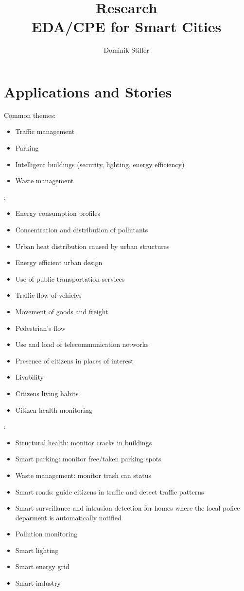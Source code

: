 \documentclass[]{scrartcl}
\title{Research \\ EDA/CPE for Smart Cities}
\author{Dominik Stiller}
\begin{document}
\maketitle


\section{Applications and Stories}

Common themes:
\begin{itemize}
	\item Traffic management
	\item Parking
	\item Intelligent buildings (security, lighting, energy efficiency)
	\item Waste management
\end{itemize}

\cite[p.~2]{Morales.2015}:
\begin{itemize}
	\item Energy consumption profiles
	\item Concentration and distribution of pollutants
	\item Urban heat distribution caused by urban structures
	\item Energy efficient urban design
	\item Use of public transportation services
	\item Traffic flow of vehicles
	\item Movement of goods and freight
	\item Pedestrian's flow
	\item Use and load of telecommunication networks
	\item Presence of citizens in places of interest
	\item Livability
	\item Citizens living habits
	\item Citizen health monitoring
\end{itemize}

\cite[p.~8~ff.]{Ahmed.2018}:
\begin{itemize}
	\item Structural health: monitor cracks in buildings
	\item Smart parking: monitor free/taken parking spots
	\item Waste management: monitor trash can status
	\item Smart roads: guide citizens in traffic and detect traffic patterns
	\item Smart surveillance and intrusion detection for homes where the local police deparment is automatically notified
	\item Pollution monitoring
	\item Smart lighting
	\item Smart energy grid
	\item Smart industry
\end{itemize}
\end{document}
